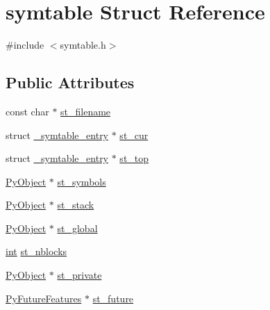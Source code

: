 \hypertarget{structsymtable}{}\section{symtable Struct Reference}
\label{structsymtable}


{\ttfamily \#include $<$symtable.\+h$>$}

\subsection*{Public Attributes}
\begin{DoxyCompactItemize}
\item 
const char $\ast$ \mbox{\hyperlink{structsymtable_a18850c493ec0be18828d8a2ca620a742}{st\+\_\+filename}}
\item 
struct \mbox{\hyperlink{struct__symtable__entry}{\+\_\+symtable\+\_\+entry}} $\ast$ \mbox{\hyperlink{structsymtable_ae79ef4b7d6cd0f034c75561fb4ae5aa0}{st\+\_\+cur}}
\item 
struct \mbox{\hyperlink{struct__symtable__entry}{\+\_\+symtable\+\_\+entry}} $\ast$ \mbox{\hyperlink{structsymtable_a1e660bc90af2b75c54cf04c639dd6d29}{st\+\_\+top}}
\item 
\mbox{\hyperlink{_python27_2object_8h_aadc84ac7aed2cfa6f20c25f62bf3dac7}{Py\+Object}} $\ast$ \mbox{\hyperlink{structsymtable_a13d41c4216ea44b4fe898b4e25410e6b}{st\+\_\+symbols}}
\item 
\mbox{\hyperlink{_python27_2object_8h_aadc84ac7aed2cfa6f20c25f62bf3dac7}{Py\+Object}} $\ast$ \mbox{\hyperlink{structsymtable_a86921f5d2e12dee08427e02bac3a95ee}{st\+\_\+stack}}
\item 
\mbox{\hyperlink{_python27_2object_8h_aadc84ac7aed2cfa6f20c25f62bf3dac7}{Py\+Object}} $\ast$ \mbox{\hyperlink{structsymtable_a7c81861d1b92f6354eee2de2e83585fd}{st\+\_\+global}}
\item 
\mbox{\hyperlink{warnings_8h_a74f207b5aa4ba51c3a2ad59b219a423b}{int}} \mbox{\hyperlink{structsymtable_a5a1d9787075312c4d687157e452235b9}{st\+\_\+nblocks}}
\item 
\mbox{\hyperlink{_python27_2object_8h_aadc84ac7aed2cfa6f20c25f62bf3dac7}{Py\+Object}} $\ast$ \mbox{\hyperlink{structsymtable_a9de0bc82e83fa302373057f56043fdbb}{st\+\_\+private}}
\item 
\mbox{\hyperlink{struct_py_future_features}{Py\+Future\+Features}} $\ast$ \mbox{\hyperlink{structsymtable_ae8e551973e941466d3d5fee2f96c0815}{st\+\_\+future}}
\end{DoxyCompactItemize}


